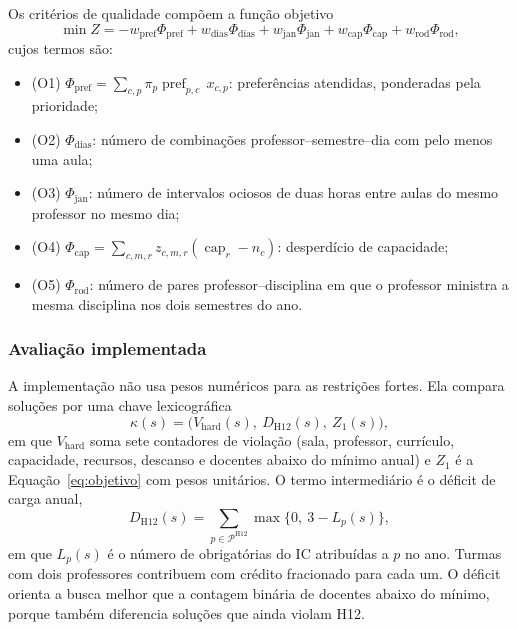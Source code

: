 Os critérios de qualidade compõem a função objetivo
\begin{equation}
  \min Z = -w_{\mathrm{pref}}\Phi_{\mathrm{pref}}
  + w_{\mathrm{dias}}\Phi_{\mathrm{dias}}
  + w_{\mathrm{jan}}\Phi_{\mathrm{jan}}
  + w_{\mathrm{cap}}\Phi_{\mathrm{cap}}
  + w_{\mathrm{rod}}\Phi_{\mathrm{rod}},
  \label{eq:objetivo}
\end{equation}
cujos termos são:
\begin{itemize}
  \setlength{\itemsep}{0pt}
  \item (O1) $\Phi_{\mathrm{pref}}=\sum_{c,p}\pi_p\operatorname{pref}_{p,c}\,x_{c,p}$: preferências atendidas, ponderadas pela prioridade;
  \item (O2) $\Phi_{\mathrm{dias}}$: número de combinações professor--semestre--dia com pelo menos uma aula;
  \item (O3) $\Phi_{\mathrm{jan}}$: número de intervalos ociosos de duas horas entre aulas do mesmo professor no mesmo dia;
  \item (O4) $\Phi_{\mathrm{cap}}=\sum_{c,m,r} z_{c,m,r}(\operatorname{cap}_r-n_c)$: desperdício de capacidade;
  \item (O5) $\Phi_{\mathrm{rod}}$: número de pares professor--disciplina em que o professor ministra a mesma disciplina nos dois semestres do ano.
\end{itemize}

\subsubsection{Avaliação implementada}
\label{subsubsec:avaliacao}

A implementação não usa pesos numéricos para as restrições fortes. Ela compara soluções por uma chave lexicográfica
\begin{equation}
  \kappa(s)=\bigl(V_{\mathrm{hard}}(s),\ D_{\mathrm{H12}}(s),\ Z_1(s)\bigr),
  \label{eq:chave}
\end{equation}
em que $V_{\mathrm{hard}}$ soma sete contadores de violação (sala, professor, currículo, capacidade, recursos, descanso e docentes abaixo do mínimo anual) e $Z_1$ é a Equação~\eqref{eq:objetivo} com pesos unitários. O termo intermediário é o déficit de carga anual,
\begin{equation}
  D_{\mathrm{H12}}(s)=\sum_{p\in\mathcal{P}^{\mathrm{H12}}}\max\{0,\ 3-L_p(s)\},
\end{equation}
em que $L_p(s)$ é o número de obrigatórias do IC atribuídas a $p$ no ano. Turmas com dois professores contribuem com crédito fracionado para cada um. O déficit orienta a busca melhor que a contagem binária de docentes abaixo do mínimo, porque também diferencia soluções que ainda violam H12.

